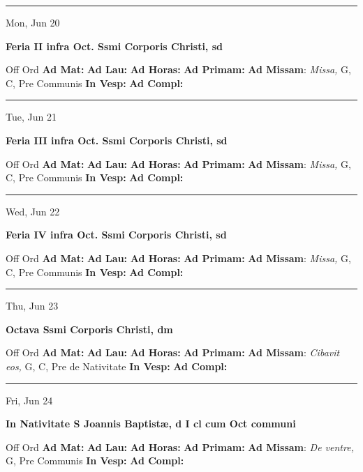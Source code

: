 \documentclass[letterpaper, 10pt]{article}
\begin{document}
\hrule
\begin{center}
Mon, Jun 20
\end{center}\textbf{ \large Feria II infra Oct. Ssmi Corporis Christi, \textnormal{\normalsize sd}}
\begin{justify}
Off Ord
\textbf{Ad Mat: }
\textbf{Ad Lau: }
\textbf{Ad Horas: }
\textbf{Ad Primam: }
\textbf{Ad Missam}: \textit{Missa,} G, C, Pre Communis
\textbf{In Vesp: }
\textbf{Ad Compl: }\end{justify}



\hrule
\begin{center}
Tue, Jun 21
\end{center}\textbf{ \large Feria III infra Oct. Ssmi Corporis Christi, \textnormal{\normalsize sd}}
\begin{justify}
Off Ord
\textbf{Ad Mat: }
\textbf{Ad Lau: }
\textbf{Ad Horas: }
\textbf{Ad Primam: }
\textbf{Ad Missam}: \textit{Missa,} G, C, Pre Communis
\textbf{In Vesp: }
\textbf{Ad Compl: }\end{justify}



\hrule
\begin{center}
Wed, Jun 22
\end{center}\textbf{ \large Feria IV infra Oct. Ssmi Corporis Christi, \textnormal{\normalsize sd}}
\begin{justify}
Off Ord
\textbf{Ad Mat: }
\textbf{Ad Lau: }
\textbf{Ad Horas: }
\textbf{Ad Primam: }
\textbf{Ad Missam}: \textit{Missa,} G, C, Pre Communis
\textbf{In Vesp: }
\textbf{Ad Compl: }\end{justify}



\hrule
\begin{center}
Thu, Jun 23
\end{center}\textbf{ \large Octava Ssmi Corporis Christi, \textnormal{\normalsize dm}}
\begin{justify}
Off Ord
\textbf{Ad Mat: }
\textbf{Ad Lau: }
\textbf{Ad Horas: }
\textbf{Ad Primam: }
\textbf{Ad Missam}: \textit{Cibavit eos,} G, C, Pre de Nativitate
\textbf{In Vesp: }
\textbf{Ad Compl: }\end{justify}



\hrule
\begin{center}
Fri, Jun 24
\end{center}\textbf{ \large In Nativitate S Joannis Baptistæ, \textnormal{\normalsize d I cl cum Oct communi}}
\begin{justify}
Off Ord
\textbf{Ad Mat: }
\textbf{Ad Lau: }
\textbf{Ad Horas: }
\textbf{Ad Primam: }
\textbf{Ad Missam}: \textit{De ventre,} G, Pre Communis
\textbf{In Vesp: }
\textbf{Ad Compl: }\end{justify}
\end{document}
